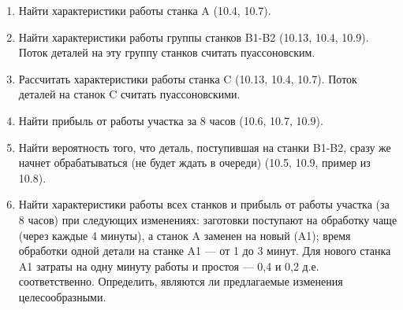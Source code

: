 \begin{enumerate}

\item Найти характеристики работы станка A (10.4, 10.7).
\item Найти характеристики работы группы станков B1-B2 (10.13, 10.4, 10.9). Поток деталей на эту группу станков считать пуассоновским.
\item Рассчитать характеристики работы станка C (10.13, 10.4, 10.7). Поток деталей на станок C считать пуассоновскими.
\item Найти прибыль от работы участка за 8 часов (10.6, 10.7, 10.9).
\item Найти вероятность того, что деталь, поступившая на станки B1-B2, сразу же начнет обрабатываться (не будет ждать в очереди) (10.5, 10.9, пример из 10.8).
\item Найти характеристики работы всех станков и прибыль от работы участка (за 8 часов) при следующих изменениях: заготовки поступают на обработку чаще (через каждые 4 минуты), а станок A заменен на новый (A1); время обработки одной детали на станке A1 --- от 1 до 3 минут. Для нового станка A1 затраты на одну минуту работы и простоя --- 0,4 и 0,2 д.е. соответственно. Определить, являются ли предлагаемые изменения целесообразными.

\end{enumerate}

\pagebreak
